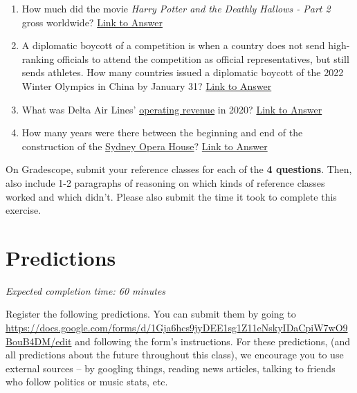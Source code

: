 \documentclass[11pt]{article}
\begin{document}
\begin{enumerate}
	\item How much did the movie \emph{Harry Potter and the Deathly Hallows - Part 2} gross worldwide? \href{https://en.wikipedia.org/wiki/Harry_Potter_and_the_Deathly_Hallows_%E2%80%93_Part_2#Box_office}{Link to Answer}
	\item A diplomatic boycott of a competition is when a country does not send high-ranking officials to attend the competition as official representatives, but still sends athletes. How many countries issued a diplomatic boycott of the 2022 Winter Olympics in China by January 31? \href{https://en.wikipedia.org/wiki/2022_Winter_Olympics#Diplomatic_boycotts}{Link to Answer}
	\item What was Delta Air Lines' \href{https://www.investopedia.com/terms/o/operating-revenue.asp}{operating revenue} in 2020? \href{https://ir.delta.com/news/news-details/2021/Delta-Air-Lines-Announces-December-Quarter-and-Full-Year-2020-Financial-Results/default.aspx}{Link to Answer}
	\item How many years were there between the beginning and end of the construction of the \href{https://en.wikipedia.org/wiki/Sydney_Opera_House#/media/File:Sydney_Australia._(21339175489).jpg}{Sydney Opera House}? \href{https://en.wikipedia.org/wiki/Sydney_Opera_House}{Link to Answer}
	
\end{enumerate}

On Gradescope, submit your reference classes for each of the \textbf{4 questions}. Then, also include 1-2 paragraphs of reasoning on which kinds of reference classes worked and which didn't. Please also submit the time it took to complete this exercise.

\section*{Predictions}

\emph{Expected completion time: 60 minutes}

Register the following predictions. You can submit them by going to \url{https://docs.google.com/forms/d/1Gja6hcs9jyDEE1sg1Z11eNskyIDaCpiW7wO9BouB4DM/edit} and following the form's instructions. For these predictions, (and all predictions about the future throughout this class), we encourage you to use external sources -- by googling things, reading news articles, talking to friends who follow politics or music stats, etc.
\end{document}
